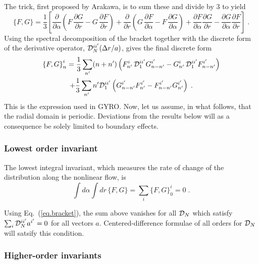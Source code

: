 \noindent
The trick, first proposed by Arakawa, is to sum these and divide 
by $3$ to yield
%
\begin{equation}
\{ F , G \} = \frac{1}{3} \left[
\frac{\partial}{\partial\alpha} 
 \left(F\,\frac{\partial G}{\partial r}-G\,
 \frac{\partial F}{\partial r}\right)
+ 
\frac{\partial }{\partial r}
\left(G\,\frac{\partial F}{\partial\alpha}-F\,
 \frac{\partial G}{\partial\alpha}\right) 
+ 
\frac{\partial F}{\partial\alpha}
\frac{\partial G}{\partial r} 
- 
\frac{\partial G}{\partial\alpha}
\frac{\partial F}{\partial r} \right] \; .
\label{eq.bracketd}
\end{equation}
%
Using the spectral decomposition of the bracket together 
with the discrete form of the derivative operator, 
${\cal D}^{ii^\prime}_N(\Delta r/a)$, gives the final 
discrete form 
%
\begin{multline}
{\left\{ F , G \right\}}_n^i = \displaystyle \frac{1}{3} \sum_{n^\prime} 
 (n+{n^\prime}) 
  \left( F_{n^\prime}^i \, {\cal D}_1^{i{i^\prime}} G_{n-n^\prime}^{i^\prime}
        - G_{n^\prime}^i \, {\cal D}_1^{i{i^\prime}} F_{n-n^\prime}^{i^\prime} \right) \\
       \displaystyle + \frac{1}{3} \sum_{n^\prime} {n^\prime} {\cal D}_1^{i{i^\prime}}  
    \left( G_{n-n^\prime}^{i^\prime} F_{n^\prime}^{i^\prime}-F_{n-n^\prime}^{i^\prime} G_{n^\prime}^{i^\prime} \right) \; .
\label{eq.bracket}
\end{multline}
%
This is the expression used in GYRO.  Now, let us assume, in what 
follows, that the radial domain is periodic.  Deviations from 
the results below will as a consequence be solely limited to 
boundary effects.

\subsubsection{Lowest order invariant}

The lowest integral invariant, which measures the rate 
of change of the distribution along the nonlinear flow, is 
%
\begin{equation}
\int d\alpha \int dr \, \{ F , G \} = 
\sum_i {\{ F , G \}}_0^i = 0 \; .
\label{inva}
\end{equation}

\noindent
Using Eq.~(\ref{eq.bracket}), the sum above vanishes
for all ${\cal D}_N$ which satisfy $\sum_i {\cal D}_N^{i{i^\prime}} a^{i^\prime} = 0$
for all vectors $a$.  Centered-difference formulae of all orders 
for ${\cal D}_N$ will satsify this condition.

\subsubsection{Higher-order invariants}

